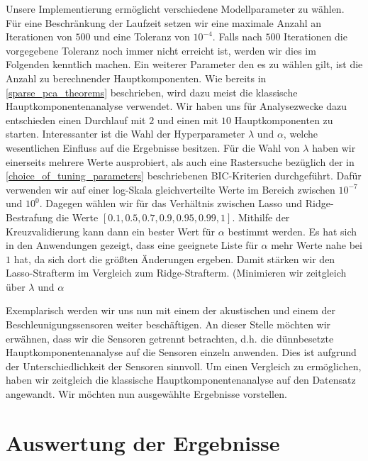 Unsere Implementierung ermöglicht verschiedene Modellparameter zu wählen. Für eine Beschränkung der Laufzeit setzen wir eine maximale Anzahl an Iterationen von $500$ und eine Toleranz von $10^{-4}$. Falls nach $500$ Iterationen die vorgegebene Toleranz noch immer nicht erreicht ist, werden wir dies im Folgenden kenntlich machen. Ein weiterer Parameter den es zu wählen gilt, ist die Anzahl zu berechnender Hauptkomponenten. Wie bereits in \ref{sparse_pca_theorems} beschrieben, wird dazu meist die klassische Hauptkomponentenanalyse verwendet. Wir haben uns für Analysezwecke dazu entschieden einen Durchlauf mit $2$ und einen mit $10$ Hauptkomponenten zu starten. Interessanter ist die Wahl der Hyperparameter $\lambda$ und $\alpha$, welche wesentlichen Einfluss auf die Ergebnisse besitzen. Für die Wahl von $\lambda$ haben wir einerseits mehrere Werte ausprobiert, als auch eine Rastersuche bezüglich der in \ref{choice_of_tuning_parameters} beschriebenen BIC-Kriterien durchgeführt. Dafür verwenden wir auf einer log-Skala gleichverteilte Werte im Bereich zwischen $10^{-7}$ und $10^0$. Dagegen wählen wir für das Verhältnis zwischen Lasso und Ridge-Bestrafung die Werte $[0.1, 0.5, 0.7, 0.9, 0.95, 0.99, 1]$. Mithilfe der Kreuzvalidierung kann dann ein bester Wert für $\alpha$ bestimmt werden. Es hat sich in den Anwendungen gezeigt, dass eine geeignete Liste für $\alpha$ mehr Werte nahe bei $1$ hat, da sich dort die größten Änderungen ergeben. Damit stärken wir den Lasso-Strafterm im Vergleich zum Ridge-Strafterm. (Minimieren wir zeitgleich über $\lambda$ und $\alpha$

Exemplarisch werden wir uns nun mit einem der akustischen und einem der Beschleunigungssensoren weiter beschäftigen. An dieser Stelle möchten wir erwähnen, dass wir die Sensoren getrennt betrachten, d.h. die dünnbesetzte Hauptkomponentenanalyse auf die Sensoren einzeln anwenden. Dies ist aufgrund der Unterschiedlichkeit der Sensoren sinnvoll. Um einen Vergleich zu ermöglichen, haben wir zeitgleich die klassische Hauptkomponentenanalyse auf den Datensatz angewandt. Wir möchten nun ausgewählte Ergebnisse vorstellen. 




\section{Auswertung der Ergebnisse}
\label{evaluation}

